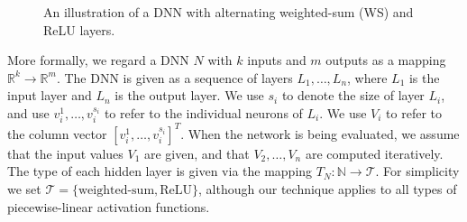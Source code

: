 \documentclass[10pt, conference, twocolumn, compsocconf]{IEEEtran}
\theoremstyle{remark}
\newcommand{\relu}{\text{ReLU}\xspace}
\begin{document}
\begin{figure}[htp]
{
}
\caption {An illustration of a DNN with alternating weighted-sum (WS) and ReLU layers.}
\label{fig:dnn}
\end{figure}

More formally, we regard a DNN $N$ with $k$ inputs and $m$ outputs as
a mapping $\mathbb{R}^k\rightarrow\mathbb{R}^m$. The DNN is given as a
sequence of layers $L_1,\ldots, L_n$, where $L_1$ is the input layer
and $L_n$ is the output layer. We use $s_i$ to denote the size of
layer $L_i$, and use $v_i^1,\ldots,v_i^{s_i}$ to refer to the
individual neurons of $L_i$. We use $V_i$ to refer to the column
vector $[v_i^1,\ldots,v_i^{s_i}]^T$.  When the network is being
evaluated, we assume that the input values $V_1$ are given, and that
$V_2,\ldots,V_n$ are computed iteratively. The type of each hidden
layer is given via the mapping
$T_N:\mathbb{N}\rightarrow\mathcal{T}$. For simplicity we set
$\mathcal{T}=\{\text{weighted-sum}, \relu{}\}$, although our technique
applies to all types of piecewise-linear activation functions.
\end{document}
